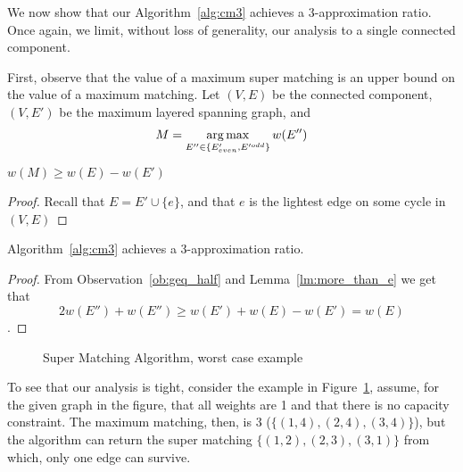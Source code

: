 We now show that our Algorithm~\ref{alg:cm3} achieves a 3-approximation ratio.
Once again, we limit, without loss of generality, our analysis to a single connected component.

First, observe that the value of a maximum super matching is an upper bound on the value
of a maximum matching.
Let $(V, E)$ be the connected component, $(V, E')$ be the maximum layered spanning graph, 
and 
$$ M = \operatorname*{arg\,max}_{E'' \in \{ E'_{even}, E'^{odd} \}}{w(E'')} $$

\begin{lemma}
\label{lm:more_than_e}
$w(M) \geq w(E) - w(E')$
\end{lemma}

\begin{proof}
Recall that $E = E' \cup \{e\}$, and that $e$ is the lightest edge on some cycle in $(V, E)$ 
\end{proof}

\begin{theorem}
Algorithm~\ref{alg:cm3} achieves a 3-approximation ratio.
\end{theorem}

\begin{proof}
From Observation~\ref{ob:geq_half} and Lemma~\ref{lm:more_than_e} we get that
$$ 2w(E'') + w(E'') \geq w(E') + w(E) - w(E') = w(E) $$.
\end{proof}

\begin{figure}
\centering

\caption{
\label{fig:3cm-tight-fig}
Super Matching Algorithm, worst case example
}
\end{figure}

To see that our analysis is tight, consider the example in Figure~\ref{fig:3cm-tight-fig},
assume, for the given graph in the figure, 
that all weights are 1 and that there is no capacity constraint.
The maximum matching, then, is 3 ($\{(1,4), (2,4), (3,4)\}$), 
but the algorithm can return the super matching $\{(1,2), (2,3), (3,1)\}$ from which, 
only one edge can survive.  
